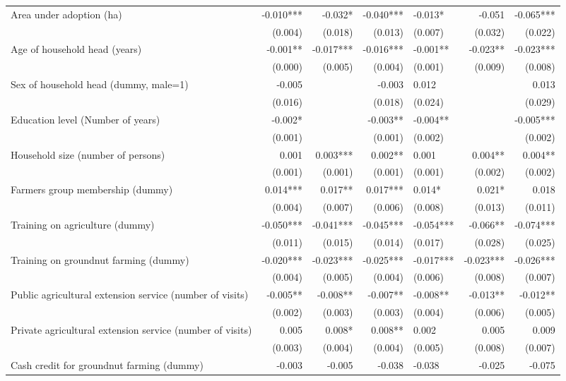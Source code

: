 \documentclass[
]{article}
\begin{document}
\begin{landscape}
\begin{longtable}[t]{lrrrlrr}
\endfoot
\bottomrule
\endlastfoot
Area under adoption (ha) & -0.010*** & -0.032* & -0.040*** & -0.013* & -0.051 & -0.065***\\
 & (0.004) & (0.018) & (0.013) & (0.007) & (0.032) & (0.022)\\
Age of household head (years) & -0.001** & -0.017*** & -0.016*** & -0.001** & -0.023** & -0.023***\\
 & (0.000) & (0.005) & (0.004) & (0.001) & (0.009) & (0.008)\\
Sex of household head (dummy, male=1) & -0.005 &  & -0.003 & 0.012 &  & 0.013\\
\addlinespace
 & (0.016) &  & (0.018) & (0.024) &  & (0.029)\\
Education level (Number of years) & -0.002* &  & -0.003** & -0.004** &  & -0.005***\\
 & (0.001) &  & (0.001) & (0.002) &  & (0.002)\\
Household size (number of persons) & 0.001 & 0.003*** & 0.002** & 0.001 & 0.004** & 0.004**\\
 & (0.001) & (0.001) & (0.001) & (0.001) & (0.002) & (0.002)\\
\addlinespace
Farmers group membership (dummy) & 0.014*** & 0.017** & 0.017*** & 0.014* & 0.021* & 0.018\\
 & (0.004) & (0.007) & (0.006) & (0.008) & (0.013) & (0.011)\\
Training on agriculture (dummy) & -0.050*** & -0.041*** & -0.045*** & -0.054*** & -0.066** & -0.074***\\
 & (0.011) & (0.015) & (0.014) & (0.017) & (0.028) & (0.025)\\
Training on groundnut farming (dummy) & -0.020*** & -0.023*** & -0.025*** & -0.017*** & -0.023*** & -0.026***\\
\addlinespace
 & (0.004) & (0.005) & (0.004) & (0.006) & (0.008) & (0.007)\\
Public agricultural extension service (number of visits) & -0.005** & -0.008** & -0.007** & -0.008** & -0.013** & -0.012**\\
 & (0.002) & (0.003) & (0.003) & (0.004) & (0.006) & (0.005)\\
Private agricultural extension service (number of visits) & 0.005 & 0.008* & 0.008** & 0.002 & 0.005 & 0.009\\
 & (0.003) & (0.004) & (0.004) & (0.005) & (0.008) & (0.007)\\
\addlinespace
Cash credit for groundnut farming (dummy) & -0.003 & -0.005 & -0.038 & -0.038 & -0.025 & -0.075\\

\end{longtable}
\end{landscape}
\end{document}
